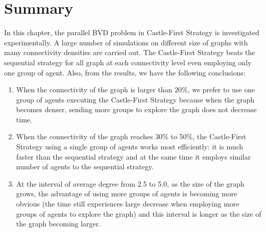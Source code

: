 \section{Summary}
In this chapter, the parallel BVD problem in Castle-First Strategy is investigated experimentally. A large number of simulations on different size of graphs with many connectivity densities are carried out. The Castle-First Strategy beats the sequential strategy for all graph at each connectivity level even employing only one group of agent. Also, from the results, we have the following conclusions:
\begin{enumerate}
\item When the connectivity of the graph is larger than $20\%$, we prefer to use one group of agents executing the Castle-First Strategy because when the graph becomes denser, sending more groups to explore the graph does not decrease time.
\item When the connectivity of the graph reaches 30\% to 50\%, the Castle-First Strategy using a single group of agents works most efficiently: it is much faster than the sequential strategy and at the same time it employs similar number of agents to the sequential strategy.
\item At the interval of average degree from 2.5 to 5.0, as the size of the graph grows, the advantage of using more groups of agents is becoming more obvious (the time still experiences large decrease when employing more groups of agents to explore the graph) and this interval is longer as the size of the graph becoming larger.
\end{enumerate}















